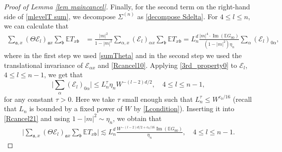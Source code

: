 \documentclass{article}
\newcommand{\1}{\mathds{1}}
\numberwithin{equation}{section}
\newcommand{\al}{\alpha}
\newcommand{\fa}{{\mathfrak a}}
\newcommand{\fb}{{\mathfrak b}}
\renewcommand{\leq}{\leqslant}
\renewcommand{\le}{\leq}
\newcommand{\E}{\mathbb{E}}
\DeclareMathOperator{\im}{Im}
\theoremstyle{plain} %
\theoremstyle{remark}
\newcommand{\wtSdeltan}{\Sigma^{(n)}}
\newcommand{\Sele}{{\mathcal E}}
\begin{document}
\begin{proof}[Proof of Lemma \ref{lem maincancel}]
Finally, for the second term on the right-hand side of \eqref{mlevelT sum}, we decompose $\wtSdeltan$ as \eqref{decompose Sdelta}. For $4\le l \le n$, we can calculate that  
\begin{align}\label{Rcancel21}
\sum_{\fa,x} \left(\Theta \Sele_{l} \right)_{\fa x} \sum_{\fb}\E T_{x \fb} &=\frac{|m|^2}{1-|m|^2}   \sum_{\al,x} \left( \Sele_{l}\right)_{\al x}  \sum_{\fb}\E T_{x \fb}   = L^d_n \frac{|m|^4\cdot \im\left(\mathbb E G_{00}\right)}{(1-|m|^2)\eta_n}\sum_{\al} \left(\Sele_{l}\right)_{ 0\al} ,
\end{align}
where in the first step we used \eqref{sumTheta} and in the second step we used the translational invariance of $\Sele_{\al x}$ and \eqref{Rcancel10}. Applying \eqref{3rd_property0} to $\Sele_l$,  $4\le l\le n-1$, we get that
$$\Big|\sum_{\al}  (\Sele_{l})_{0\al }\Big| \le L_n^\tau\eta_n W^{-(l-2)d/2},\quad 4\le l \le n-1,$$
for any constant $\tau>0$. Here we take $\tau$ small enough such that $L_n^\tau\le W^{c_0/16}$ (recall that $L_n$ is bounded by a fixed power of $W$ by \eqref{Lcondition}). Inserting it into \eqref{Rcancel21} and using $1-|m|^2\sim \eta_n$, we obtain that %
\begin{align}\label{Rcancel22}
\Big|\sum_{\fa,x} \left(\Theta \Sele_{l} \right)_{\fa x} \sum_{\fb}\E T_{x \fb}\Big| \lesssim L^d_n \frac{W^{-(l-2)d/2+c_0/16} \im \left(\mathbb EG_{00}\right)}{\eta_n} ,\quad 4\le l \le n-1.
\end{align}


\end{proof}
\end{document}
